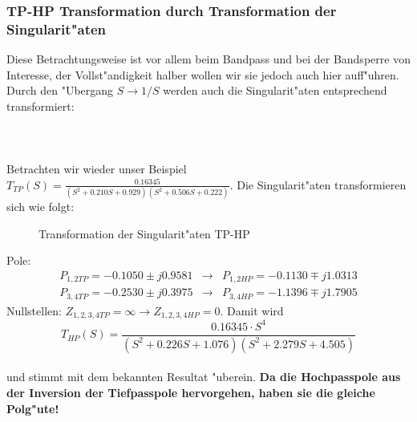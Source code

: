 \subsubsection{TP-HP Transformation durch Transformation der Singularit"aten}
Diese Betrachtungsweise ist vor allem beim Bandpass und bei der
Bandsperre von Interesse, der Vollst"andigkeit halber wollen wir sie
jedoch auch hier auff"uhren.  Durch den "Ubergang $S \longrightarrow 1/S$ werden auch die Singularit"aten entsprechend
transformiert:\\~~\\
\\~~\\
\nit Betrachten wir wieder unser Beispiel $T_{TP}(S)=\frac{0.16345}{(S^{2}+0.210S+0.929)(S^{2}+0.506S+0.222)}$. Die Singularit"aten transformieren sich wie folgt:
\begin{figure}[!htb]
\vspace*{-3mm}
\begin{center}
  \caption{Transformation der Singularit"aten  TP-HP}
\end{center}
\vspace*{-6mm}
\end{figure}
\nit Pole:
\begin{eqnarray*}
P_{1,2TP}=- 0.1050\pm j 0.9581 &\longrightarrow & 
P_{1,2HP}=- 0.1130\mp j 1.0313 \\
P_{3,4TP}=- 0.2530\pm j 0.3975 &\longrightarrow &
P_{3,4HP}=- 1.1396\mp j 1.7905
\end{eqnarray*}
\nit Nullstellen: $Z_{1,2,3,4TP}=\infty \longrightarrow Z_{1,2,3,4HP}=0$.
Damit wird
\[
T_{HP}(S)=\frac{0.16345\cdot S^{4}}{(S^{2}+0.226S+1.076)(S^{2}+2.279S+4.505)}
\]\\
\nit und stimmt mit dem bekannten Resultat "uberein. {\bf Da die
  Hochpasspole aus der Inversion der Tiefpasspole
  hervorgehen, haben sie die gleiche Polg"ute!}
